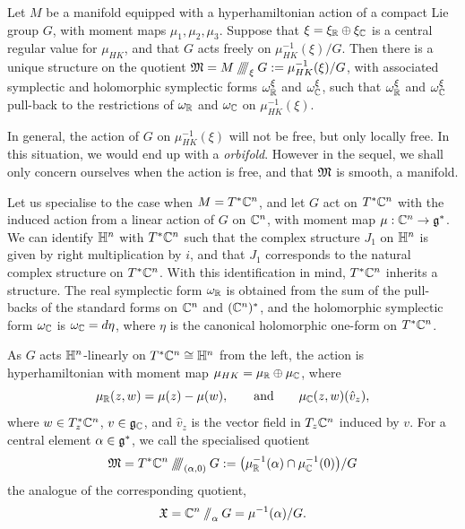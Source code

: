 \begin{thm}
	Let $M$ be a \HK manifold equipped with a hyperhamiltonian action of a compact Lie group $G$, with moment maps $\mu_{1}, \mu_{2}, \mu_{3}$. Suppose that $\xi = \xi_{\mathbb{R}} \oplus \xi_{\mathbb{C}}$ is a central regular value for $\mu_{HK}$, and that $G$ acts freely on $\mu_{HK}^{-1}(\xi)/G$. Then there is a unique \HK structure on the \HK quotient $\mathfrak{M} = M\mathbin{/\mkern-6mu/\mkern-6mu/\mkern-6mu/}_{\xi}G := \mu_{HK}^{-1}(\xi)/G$, with associated symplectic and holomorphic symplectic forms $\omega_{\mathbb{R}}^{\xi}$ and $\omega_{\mathbb{C}}^{\xi}$, such that $\omega_{\mathbb{R}}^{\xi}$ and $\omega_{\mathbb{C}}^{\xi}$ pull-back to the restrictions of $\omega_{\mathbb{R}}$ and $\omega_{\mathbb{C}}$ on $\mu_{HK}^{-1}(\xi)$.
\end{thm}
In general, the action of $G$ on $\mu_{HK}^{-1}(\xi)$ will not be free, but only locally free. In this situation, we would end up with a \emph{\HK orbifold}. However in the sequel, we shall only concern ourselves when the action is free, and that $\mathfrak{M}$ is smooth, \ie a manifold.

Let us specialise to the case when $M = T^{\ast}\mathbb{C}^{n}$, and let $G$ act on $T^{\ast}\mathbb{C}^{n}$ with the induced action from a linear action of $G$ on $\mathbb{C}^{n}$, with moment map $\mu : \mathbb{C}^{n} \rightarrow \mathfrak{g}^{\ast}$. We can identify $\mathbb{H}^{n}$ with $T^{\ast}\mathbb{C}^{n}$ such that the complex structure $J_{1}$ on $\mathbb{H}^{n}$ is given by right multiplication by $i$, and that $J_{1}$ corresponds to the natural complex structure on $T^{\ast}\mathbb{C}^{n}$. With this identification in mind, $T^{\ast}\mathbb{C}^{n}$ inherits a \HK structure. The real symplectic form $\omega_{\mathbb{R}}$ is obtained from the sum of the pull-backs of the standard \K forms on $\mathbb{C}^{n}$ and $(\mathbb{C}^{n})^{\ast}$, and the holomorphic symplectic form $\omega_{\mathbb{C}}$ is $\omega_{\mathbb{C}} = d\eta$, where $\eta$ is the canonical holomorphic one-form on $T^{\ast}\mathbb{C}^{n}$.

As $G$ acts $\mathbb{H}^{n}$-linearly on $T^{\ast}\mathbb{C}^{n} \cong \mathbb{H}^{n}$ from the left, the action is hyperhamiltonian with moment map $\mu_{HK} = \mu_{\mathbb{R}} \oplus \mu_{\mathbb{C}}$, where
$$
	\mu_{\mathbb{R}}(z,w) = \mu(z) - \mu(w),\qquad \text{and} \qquad \mu_{\mathbb{C}}(z,w)(\hat{v}_{z}),
$$
where $w\in T_{z}^{\ast}\mathbb{C}^{n}$, $v \in \mathfrak{g}_{\mathbb{C}}$, and $\hat{v}_{z}$ is the vector field in $T_{z}\mathbb{C}^{n}$ induced by $v$. For a central element $\alpha \in \mathfrak{g}^{\ast}$, we call the specialised \HK quotient
$$
	\mathfrak{M} = T^{\ast}\mathbb{C}^{n}\mathbin{/\mkern-6mu/\mkern-6mu/\mkern-6mu/}_{(\alpha,0)}G := \big( \mu_{\mathbb{R}}^{-1}(\alpha) \cap \mu_{\mathbb{C}}^{-1}(0)\big)/G
$$
the \HK analogue of the corresponding \K quotient,
$$
	\mathfrak{X} = \mathbb{C}^{n} \mathbin{/\mkern-6mu/}_{\alpha} G = \mu^{-1}(\alpha)/G.
$$

